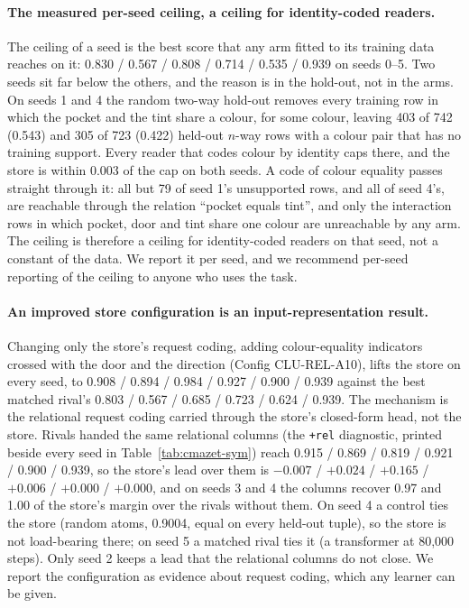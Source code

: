 \documentclass{article} %
\begin{document}
\paragraph{The measured per-seed ceiling, a ceiling for identity-coded readers.} The ceiling of a
seed is the best score that any arm fitted to its training data reaches on it: 0.830 / 0.567 / 0.808
/ 0.714 / 0.535 / 0.939 on seeds 0--5. Two seeds sit far below the others, and the reason is in the
hold-out, not in the arms. On seeds 1 and 4 the random two-way hold-out removes every training row in
which the pocket and the tint share a colour, for some colour, leaving 403 of 742 (0.543) and 305 of
723 (0.422) held-out $n$-way rows with a colour pair that has no training support. Every reader that
codes colour by identity caps there, and the store is within 0.003 of the cap on both seeds. A code of
colour equality passes straight through it: all but 79 of seed 1's unsupported rows, and all of seed
4's, are reachable through the relation ``pocket equals tint'', and only the interaction rows in which
pocket, door and tint share one colour are unreachable by any arm. The ceiling is therefore a ceiling
for identity-coded readers on that seed, not a constant of the data. We report it per seed, and we
recommend per-seed reporting of the ceiling to anyone who uses the task.

\paragraph{An improved store configuration is an input-representation result.} Changing only the
store's request coding, adding colour-equality indicators crossed with the door and the direction
(Config CLU-REL-A10), lifts the store on every seed, to 0.908 / 0.894 / 0.984 / 0.927 / 0.900 / 0.939
against the best matched rival's 0.803 / 0.567 / 0.685 / 0.723 / 0.624 / 0.939. The mechanism is the
relational request coding carried through the store's closed-form head, not the store. Rivals handed
the same relational columns (the \texttt{+rel} diagnostic, printed beside every seed in
Table~\ref{tab:cmazet-sym}) reach 0.915 / 0.869 / 0.819 / 0.921 / 0.900 / 0.939, so the store's lead
over them is $-0.007$ / $+0.024$ / $+0.165$ / $+0.006$ / $+0.000$ / $+0.000$, and on seeds 3 and 4 the
columns recover 0.97 and 1.00 of the store's margin over the rivals without them. On seed 4 a control
ties the store (random atoms, 0.9004, equal on every held-out tuple), so the store is not load-bearing
there; on seed 5 a matched rival ties it (a transformer at 80,000 steps). Only seed 2 keeps a lead
that the relational columns do not close. We report the configuration as evidence about request
coding, which any learner can be given.
\end{document}
